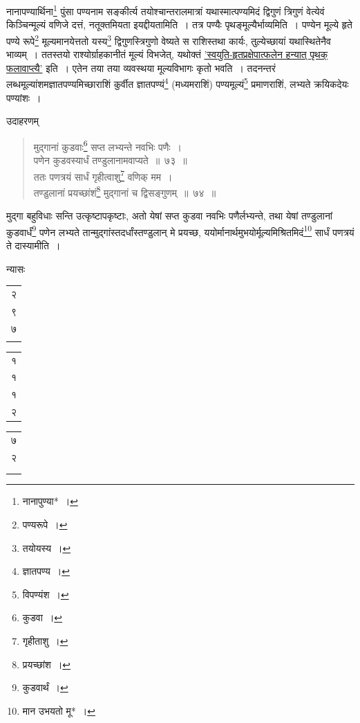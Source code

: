 \documentclass[10pt, openany]{book}
\begin{document}
{{ {नानापण्यार्थिना\renewcommand{\thefootnote}{\s १}\footnote{\s नानापुण्या*~।}  पुंसा पण्यनाम सङ्कीर्त्य तयोश्चान्तरालमात्रां
यथास्मात्पण्यमिदं}
{द्विगुणं त्रिगुणं वेत्येवं किञ्चिन्मूल्यं वणिजे दत्तं, नतूक्तमियता
इयद्दीयतामिति~। तत्र पण्यैः}
{पृथङ्मूल्यैर्भाव्यमिति~। पण्येन मूल्ये हृते पण्ये रूपे\renewcommand{\thefootnote}{\s २}\footnote{\s पण्यरूपे~।}  
मूल्यमानयेत्ततो यस्य\renewcommand{\thefootnote}{\s ३}\footnote{\s तयोयस्य~।}   द्विगुणस्त्रिगुणो वेष्यते}
{स राशिस्तथा कार्यः, तुल्येच्छायां यथास्थितेनैव भाव्यम्~। ततस्तयो
राश्योर्ग्राहकानीतं मूल्यं}
{विभजेत्, यथोक्तं \hyperref[59.1]{'स्वयुति-हृतप्रक्षेपात्फलेन हन्यात् पृथक् फलावाप्त्यै'}
इति~। एतेन तया तया}
{व्यवस्थया मूल्यविभागः कृतो भवति~। तदनन्तरं
लब्धमूल्यांशमज्ञातपण्यमिच्छाराशिं कुर्वीत}
{ज्ञातपण्यं\renewcommand{\thefootnote}{\s ४}\footnote{\s ज्ञातपण्य~।}   (मध्यमराशिं) पण्यमूल्यं\renewcommand{\thefootnote}{\s ५}\footnote{\s विपण्यंश~।}   प्रमाणराशिं, लभ्यते
क्रयिकदेयः पण्यांशः~।}

\vspace{3mm}
{उदाहरणम्\textemdash}

\begin{quote}
    
{\eg  मुद्गानां कुडवाः\renewcommand{\thefootnote}{\s ६}\footnote{\s कुडवा~।} सप्त लभ्यन्ते नवभिः पणैः~। \\
 पणेन कुडवस्यार्धं तण्डुलानामवाप्यते~॥~७३~॥ \\
 ततः पणत्रयं सार्धं गृहीत्वाशु\renewcommand{\thefootnote}{\s ७}\footnote{\s गृहीताशु~।} वणिक् मम~। \\
 तण्डुलानां प्रयच्छांशं\renewcommand{\thefootnote}{\s ८}\footnote{\s प्रयच्छांश~।} मुद्गानां च द्विसङ्गुणम्~॥~७४~॥}\end{quote}

{मुद्गा बहुविधाः सन्ति उत्कृष्टापकृष्टाः, अतो येषां सप्त कुडवा नवभिः
पणैर्लभ्यन्ते,}
{तथा येषां तण्डुलानां कुडवार्धं\renewcommand{\thefootnote}{\s ९}\footnote{\s कुडवार्थं~।}   पणेन लभ्यते
तान्मुद्गांस्तदर्धांस्तण्डुलान् मे प्रयच्छ, ययोर्मानार्थमुभयोर्मूल्यमिश्रितमिदं\renewcommand{\thefootnote}{\s १०}\footnote{\s *मान उभयतो मू*~।} सार्धं पणत्रयं ते दास्यामीति~।}
\vspace{3mm}

{न्यासः\textendash \,\begin{tabular}{r}२\\ ९\\७ \\ \\ \end{tabular}}\begin{tabular}{|r|}१ \\१\\१ \\ २\end{tabular}\begin{tabular}{r} ७ \\ २ \\ \\ \\ \end{tabular}
\vspace{3mm}

}}
\end{document}
